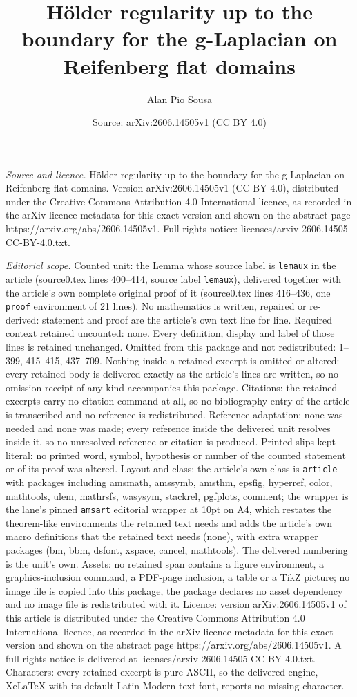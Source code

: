 \documentclass[10pt,a4paper]{amsart}
\title[H\"older regularity up to the boundary for the g-Laplacian o]{H\"older regularity up to the boundary for the g-Laplacian on Reifenberg flat domains}
\author{Alan Pio Sousa}
\date{Source: arXiv:2606.14505v1 (CC BY 4.0)}
\begin{document}
\maketitle

\noindent\emph{Source and licence.} H\"older regularity up to the boundary for the g-Laplacian on Reifenberg flat domains. Version arXiv:2606.14505v1 (CC BY 4.0), distributed under the Creative Commons Attribution 4.0 International licence, as recorded in the arXiv licence metadata for this exact version and shown on the abstract page https://arxiv.org/abs/2606.14505v1. Full rights notice: licenses/arxiv-2606.14505-CC-BY-4.0.txt.\par\smallskip

\noindent\textit{Editorial scope.} Counted unit: the Lemma whose source label is \texttt{lemaux} in the article (source0.tex lines 400--414, source label \texttt{lemaux}), delivered together with the article's own complete original proof of it (source0.tex lines 416--436, one \texttt{proof} environment of 21 lines). No mathematics is written, repaired or re-derived: statement and proof are the article's own text line for line. Required context retained uncounted: none. Every definition, display and label of those lines is retained unchanged. Omitted from this package and not redistributed: 1--399, 415--415, 437--709. Nothing inside a retained excerpt is omitted or altered: every retained body is delivered exactly as the article's lines are written, so no omission receipt of any kind accompanies this package. Citations: the retained excerpts carry no citation command at all, so no bibliography entry of the article is transcribed and no reference is redistributed. Reference adaptation: none was needed and none was made; every reference inside the delivered unit resolves inside it, so no unresolved reference or citation is produced. Printed slips kept literal: no printed word, symbol, hypothesis or number of the counted statement or of its proof was altered. Layout and class: the article's own class is \texttt{article} with packages including amsmath, amssymb, amsthm, epsfig, hyperref, color, mathtools, ulem, mathrsfs, wasysym, stackrel, pgfplots, comment; the wrapper is the lane's pinned \texttt{amsart} editorial wrapper at 10pt on A4, which restates the theorem-like environments the retained text needs and adds the article's own macro definitions that the retained text needs (none), with extra wrapper packages (bm, bbm, dsfont, xspace, cancel, mathtools). The delivered numbering is the unit's own. Assets: no retained span contains a figure environment, a graphics-inclusion command, a PDF-page inclusion, a table or a TikZ picture; no image file is copied into this package, the package declares no asset dependency and no image file is redistributed with it. Licence: version arXiv:2606.14505v1 of this article is distributed under the Creative Commons Attribution 4.0 International licence, as recorded in the arXiv licence metadata for this exact version and shown on the abstract page https://arxiv.org/abs/2606.14505v1. A full rights notice is delivered at licenses/arxiv-2606.14505-CC-BY-4.0.txt. Characters: every retained excerpt is pure ASCII, so the delivered engine, XeLaTeX with its default Latin Modern text font, reports no missing character.
\end{document}
